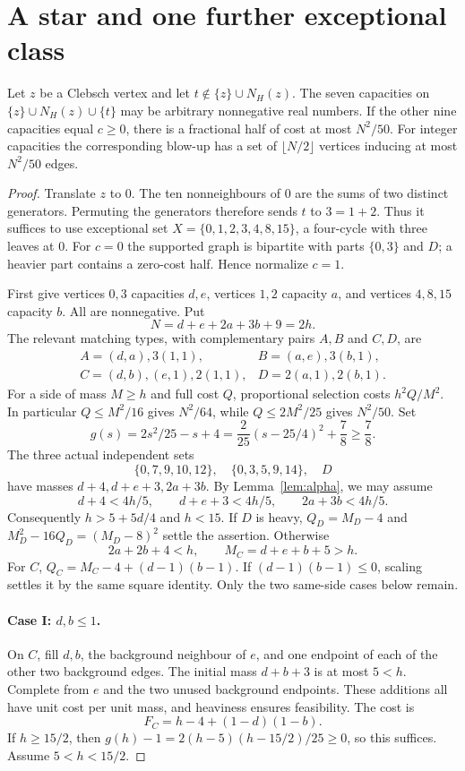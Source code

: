 \section{A star and one further exceptional class}

\begin{theorem}\label{thm:sevenstar}
Let $z$ be a Clebsch vertex and let $t\notin\{z\}\cup N_H(z)$.
The seven capacities on $\{z\}\cup N_H(z)\cup\{t\}$ may be arbitrary
nonnegative real numbers. If the other nine capacities equal $c\geq0$,
there is a fractional half of cost at most $N^2/50$.
For integer capacities the corresponding blow-up has a set of
$\lfloor N/2\rfloor$ vertices inducing at most $N^2/50$ edges.
\end{theorem}
\begin{proof}
Translate $z$ to $0$. The ten nonneighbours of $0$ are the sums of two
distinct generators. Permuting the generators therefore sends $t$ to
$3=1+2$. Thus it suffices to use exceptional set
$X=\{0,1,2,3,4,8,15\}$, a four-cycle with three leaves at $0$.
For $c=0$ the supported graph is bipartite with parts $\{0,3\}$ and $D$;
a heavier part contains a zero-cost half. Hence normalize $c=1$.

First give vertices $0,3$ capacities $d,e$, vertices $1,2$ capacity $a$,
and vertices $4,8,15$ capacity $b$. All are nonnegative. Put
\[
 N=d+e+2a+3b+9=2h.
\]
The relevant matching types, with complementary pairs $A,B$ and $C,D$, are
\[
\begin{array}{ll}
 A=(d,a),3(1,1),&B=(a,e),3(b,1),\\
 C=(d,b),(e,1),2(1,1),&D=2(a,1),2(b,1).
\end{array}
\]
For a side of mass $M\geq h$ and full cost $Q$, proportional selection
costs $h^2Q/M^2$. In particular $Q\leq M^2/16$ gives $N^2/64$, while
$Q\leq2M^2/25$ gives $N^2/50$. Set
\[
 g(s)=2s^2/25-s+4
     =\frac2{25}(s-25/4)^2+\frac78\geq\frac78.
\]
The three actual independent sets
\[
 \{0,7,9,10,12\},\quad \{0,3,5,9,14\},\quad D
\]
have masses $d+4,d+e+3,2a+3b$. By Lemma~\ref{lem:alpha}, we may assume
\[
 d+4<4h/5,\qquad d+e+3<4h/5,\qquad2a+3b<4h/5. \tag{SI}
\]
Consequently $h>5+5d/4$ and $h<15$.
If $D$ is heavy, $Q_D=M_D-4$ and
$M_D^2-16Q_D=(M_D-8)^2$ settle the assertion. Otherwise
\[
 2a+2b+4<h,\qquad M_C=d+e+b+5>h. \tag{SD}
\]
For $C$, $Q_C=M_C-4+(d-1)(b-1)$.
If $(d-1)(b-1)\leq0$, scaling settles it by the same square identity.
Only the two same-side cases below remain.

\paragraph{Case I: $d,b\leq1$.}
On $C$, fill $d,b$, the background neighbour of $e$, and one endpoint
of each of the other two background edges. The initial mass $d+b+3$
is at most $5<h$. Complete from $e$ and the two unused background
endpoints. These additions all have unit cost per unit mass, and
heaviness ensures feasibility. The cost is
\[
 F_C=h-4+(1-d)(1-b). \tag{SC}
\]
If $h\geq15/2$, then
$g(h)-1=2(h-5)(h-15/2)/25\geq0$, so this suffices.
Assume $5<h<15/2$.


\end{proof}
